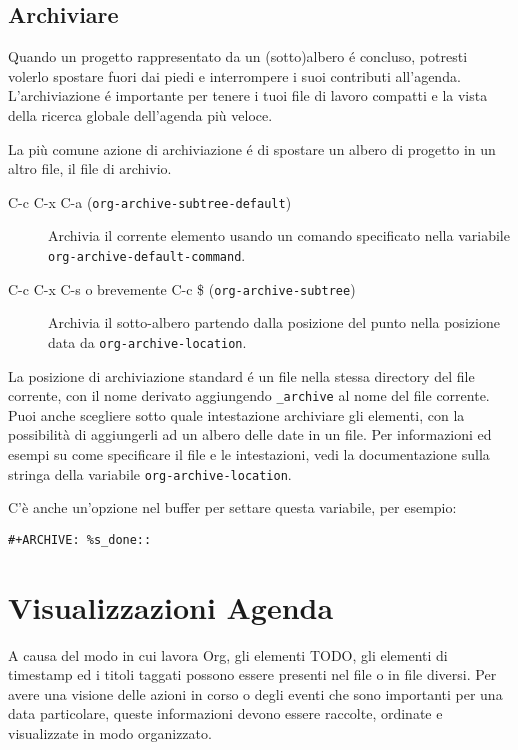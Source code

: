 \documentclass[11pt]{article}
\begin{document}
\subsection{Archiviare}
\label{sec:org1430392}
Quando un progetto rappresentato da un (sotto)albero é concluso,
potresti volerlo spostare fuori dai piedi e interrompere i suoi
contributi all'agenda. L'archiviazione é importante per tenere i tuoi
file di lavoro compatti e la vista della ricerca globale dell'agenda
più veloce.

La più comune azione di archiviazione é di spostare un albero di
progetto in un altro file, il file di archivio.

\begin{description}
\item[{C-c C-x C-a (\texttt{org-archive-subtree-default})}] Archivia il corrente elemento usando un comando specificato nella
variabile \texttt{org-archive-default-command}.

\item[{C-c C-x C-s o brevemente C-c \$ (\texttt{org-archive-subtree})}] Archivia il sotto-albero partendo dalla posizione del punto nella
posizione data da \texttt{org-archive-location}.
\end{description}

La posizione di archiviazione standard é un file nella stessa
directory del file corrente, con il nome derivato aggiungendo
\texttt{\_archive} al nome del file corrente. Puoi anche scegliere sotto quale
intestazione archiviare gli elementi, con la possibilità di
aggiungerli ad un albero delle date in un file. Per informazioni ed
esempi su come specificare il file e le intestazioni, vedi la documentazione
sulla stringa della variabile \texttt{org-archive-location}.

C'è anche un'opzione nel buffer per settare questa variabile, per
esempio:

\begin{verbatim}
#+ARCHIVE: %s_done::
\end{verbatim}

\section{Visualizzazioni Agenda}
\label{sec:org42aa4c4}
A causa del modo in cui lavora Org, gli elementi TODO, gli elementi di
timestamp ed i titoli taggati possono essere presenti nel file o in
file diversi. Per avere una visione delle azioni in corso o degli
eventi che sono importanti per una data particolare, queste
informazioni devono essere raccolte, ordinate e visualizzate in modo
organizzato.
\end{document}
